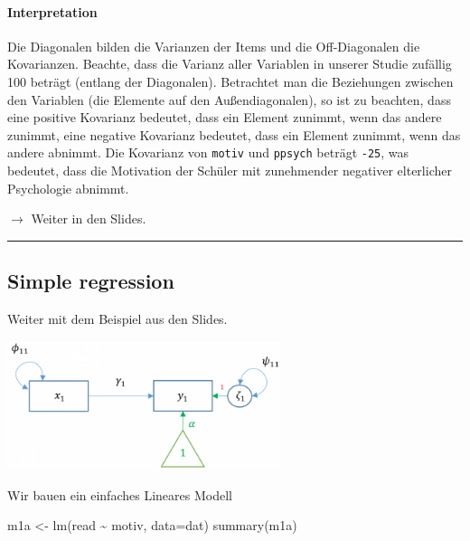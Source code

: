 \documentclass[
]{article}
\newenvironment{Shaded}{\begin{snugshade}}{\end{snugshade}}
\newcommand{\AttributeTok}[1]{\textcolor[rgb]{0.77,0.63,0.00}{#1}}
\newcommand{\FunctionTok}[1]{\textcolor[rgb]{0.00,0.00,0.00}{#1}}
\newcommand{\NormalTok}[1]{#1}
\newcommand{\OtherTok}[1]{\textcolor[rgb]{0.56,0.35,0.01}{#1}}
\newcommand{\SpecialCharTok}[1]{\textcolor[rgb]{0.00,0.00,0.00}{#1}}
\begin{document}
\hypertarget{interpretation}{%
\paragraph{Interpretation}\label{interpretation}}

Die Diagonalen bilden die Varianzen der Items und die Off-Diagonalen die
Kovarianzen. Beachte, dass die Varianz aller Variablen in unserer Studie
zufällig 100 beträgt (entlang der Diagonalen). Betrachtet man die
Beziehungen zwischen den Variablen (die Elemente auf den
Außendiagonalen), so ist zu beachten, dass eine positive Kovarianz
bedeutet, dass ein Element zunimmt, wenn das andere zunimmt, eine
negative Kovarianz bedeutet, dass ein Element zunimmt, wenn das andere
abnimmt. Die Kovarianz von \texttt{motiv} und \texttt{ppsych} beträgt
\texttt{-25}, was bedeutet, dass die Motivation der Schüler mit
zunehmender negativer elterlicher Psychologie abnimmt.

\(\rightarrow\) Weiter in den Slides.

\begin{center}\rule{0.5\linewidth}{0.5pt}\end{center}

\hypertarget{simple-regression}{%
\subsection{Simple regression}\label{simple-regression}}

Weiter mit dem Beispiel aus den Slides.

\includegraphics[width=0.6\textwidth,height=\textheight]{lisrel_bsp.png}

Wir bauen ein einfaches Lineares Modell

\begin{Shaded}
\begin{Highlighting}[]
\NormalTok{m1a }\OtherTok{\textless{}{-}} \FunctionTok{lm}\NormalTok{(read }\SpecialCharTok{\textasciitilde{}}\NormalTok{ motiv, }\AttributeTok{data=}\NormalTok{dat)}
\FunctionTok{summary}\NormalTok{(m1a)}
\end{Highlighting}
\end{Shaded}
\end{document}
